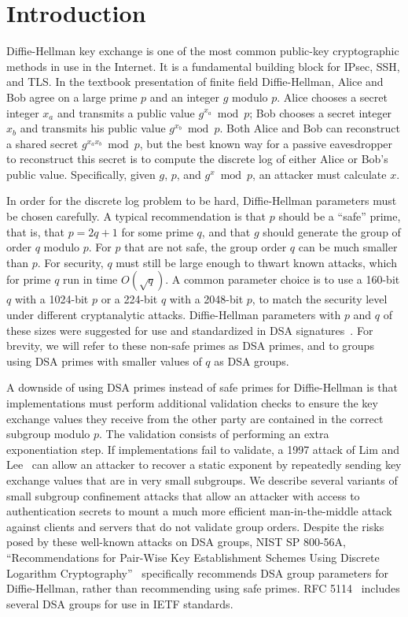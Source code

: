  
\section{Introduction}
 
Diffie-Hellman key exchange is one of the most common public-key cryptographic
methods in use in the Internet. It is a fundamental building block for IPsec,
SSH, and TLS\@. In the textbook presentation of finite field Diffie-Hellman,
Alice and Bob agree on a large prime $p$ and an integer $g$ modulo $p$. Alice
chooses a secret integer $x_a$ and transmits a public value $g^{x_a} \bmod p$;
Bob chooses a secret integer $x_b$ and transmits his public value $g^{x_b}
\bmod p$. Both Alice and Bob can reconstruct a shared secret $g^{x_a x_b} \bmod
p$, but the best known way for a passive eavesdropper to reconstruct this
secret is to compute the discrete log of either Alice or Bob's public value.
Specifically, given $g$, $p$, and $g^x \bmod p$, an attacker must calculate
$x$.

In order for the discrete log problem to be hard, Diffie-Hellman parameters
must be chosen carefully. A typical recommendation is that $p$ should be a
``safe'' prime, that is, that $p = 2q+1$ for some prime $q$, and that $g$
should generate the group of order $q$ modulo $p$. For $p$ that are not safe,
the group order $q$ can be much smaller than $p$. For security, $q$ must still
be large enough to thwart known attacks, which for prime $q$ run in time
$O(\sqrt{q})$. A common parameter choice is to use a 160-bit $q$ with a
1024-bit $p$ or a 224-bit $q$ with a 2048-bit $p$, to match the security level
under different cryptanalytic attacks. Diffie-Hellman parameters with $p$ and
$q$ of these sizes were suggested for use and standardized in DSA
signatures~\cite{dsa}. For brevity, we will refer to these non-safe primes as
DSA primes, and to groups using DSA primes with smaller values of $q$ as  DSA
groups.

A downside of using DSA primes instead of safe primes for Diffie-Hellman is
that implementations must perform additional validation checks to ensure the
key exchange values they receive from the other party are contained in the
correct subgroup modulo $p$. The validation consists of performing an extra
exponentiation step. If implementations fail to validate, a 1997 attack of Lim
and Lee~\cite{Lim1997} can allow an attacker to recover a static exponent by
repeatedly sending key exchange values that are in very small subgroups. We
describe several variants of small subgroup confinement attacks that allow an
attacker with access to authentication secrets to mount a much more efficient
man-in-the-middle attack against clients and servers that do not validate group
orders. Despite the risks posed by these well-known attacks on DSA groups, NIST SP 800-56A, ``Recommendations
for Pair-Wise Key Establishment Schemes Using Discrete Logarithm
Cryptography''~\cite{barker2007sp} specifically recommends DSA group parameters
for Diffie-Hellman, rather than recommending using safe primes. RFC
5114~\cite{rfc5114} includes several DSA groups for use in IETF standards. 

